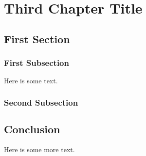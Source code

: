 \chapter{Third Chapter Title}
\chaptoc %

\section{First Section}
\subsection{First Subsection}
Here is some text. 

\subsection{Second Subsection}

\section{Conclusion}
Here is some more text. 
